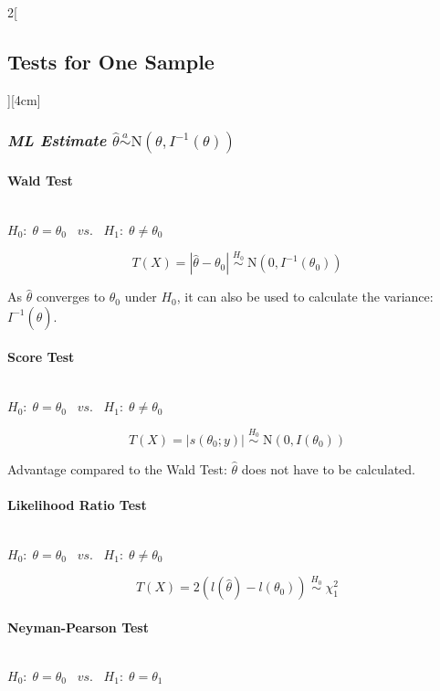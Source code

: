 \documentclass[8pt]{extarticle}
\begin{document}
\begin{multicols}{2}[\subsection{Tests for One Sample}][4cm]
  
  
\subsubsection*{\textit{ML Estimate $\hat{\theta} \overset{a}{\sim} \mathrm{N}(\theta, I^{-1}(\theta))$}}
  
  \paragraph{Wald Test} \ \\
  
  \noindent $H_0\!:\; \theta = \theta_0 \;\;\; vs. \;\;\; H_1\!:\; \theta \neq \theta_0$
  
  $$T(X) = |\hat{\theta} - \theta_0|\; \overset{H_0}{\sim}\; \mathrm{N}(0, I^{-1}(\theta_0))$$
  
  \noindent As $\hat{\theta}$ converges to $\theta_0$ under $H_0$, it can also be used to calculate the variance: $I^{-1}(\hat{\theta})$.
  
    \paragraph{Score Test} \ \\
  
  \noindent $H_0\!:\; \theta = \theta_0 \;\;\; vs. \;\;\; H_1\!:\; \theta \neq \theta_0$
  
  $$T(X) = |s(\theta_0;y)|\; \overset{H_0}{\sim}\; \mathrm{N}(0, I(\theta_0))$$
  
  \noindent Advantage compared to the Wald Test: $\hat{\theta}$ does not have to be calculated.
  
      \paragraph{Likelihood Ratio Test} \ \\
  
  \noindent $H_0\!:\; \theta = \theta_0 \;\;\; vs. \;\;\; H_1\!:\; \theta \neq \theta_0$
  
  $$T(X) = 2(l(\hat{\theta}) - l(\theta_0)) \; \overset{H_0}{\sim}\; \chi^2_1$$
  
      \paragraph{Neyman-Pearson Test} \ \\
  
  \noindent $H_0\!:\; \theta = \theta_0 \;\;\; vs. \;\;\; H_1\!:\; \theta = \theta_1$
  

\end{multicols}
\end{document}
